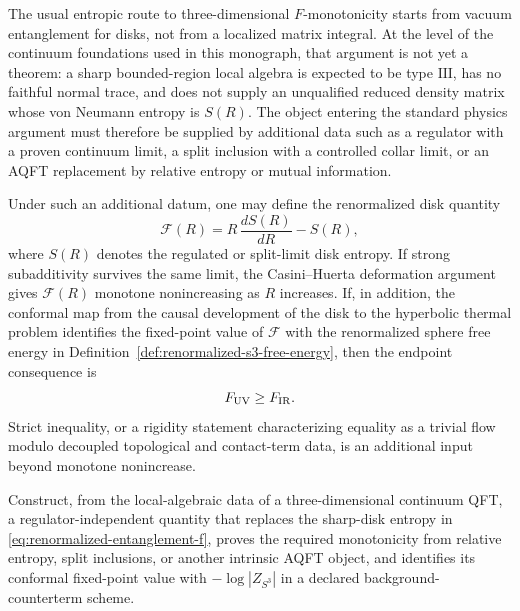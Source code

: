 \begin{remark}
\label{rem:conditional-entropic-f-monotonicity}
The usual entropic route to three-dimensional \(F\)-monotonicity starts from
vacuum entanglement for disks, not from a localized matrix integral.  At the
level of the continuum foundations used in this monograph, that argument is
not yet a theorem: a sharp bounded-region local algebra is expected to be
type \(\mathrm{III}\), has no faithful normal trace, and does not supply an
unqualified reduced density matrix whose von Neumann entropy is \(S(R)\).
The object entering the standard physics argument must therefore be supplied
by additional data such as a regulator with a proven continuum limit, a split
inclusion with a controlled collar limit, or an AQFT replacement by relative
entropy or mutual information.

Under such an additional datum, one may define the renormalized disk
quantity
\begin{equation}
  \mathcal F(R)=R\,\frac{dS(R)}{dR}-S(R),
  \label{eq:renormalized-entanglement-f}
\end{equation}
where \(S(R)\) denotes the regulated or split-limit disk entropy.  If strong
subadditivity survives the same limit, the Casini--Huerta deformation
argument gives \(\mathcal F(R)\) monotone nonincreasing as \(R\) increases.
If, in addition, the conformal map from the causal development of the disk to
the hyperbolic thermal problem identifies the fixed-point value of
\(\mathcal F\) with the renormalized sphere free energy in
Definition~\ref{def:renormalized-s3-free-energy}, then the endpoint
consequence is
\begin{equation}
  F_{\rm UV}\ge F_{\rm IR}.
  \label{eq:conditional-f-monotonicity}
\end{equation}
Strict inequality, or a rigidity statement characterizing equality as a
trivial flow modulo decoupled topological and contact-term data, is an
additional input beyond monotone nonincrease.
\end{remark}

\begin{openproblem}
\label{op:aqft-f-monotonicity}
Construct, from the local-algebraic data of a three-dimensional continuum
QFT, a regulator-independent quantity that replaces the sharp-disk entropy
in \eqref{eq:renormalized-entanglement-f}, proves the required monotonicity
from relative entropy, split inclusions, or another intrinsic AQFT object,
and identifies its conformal fixed-point value with
\(-\log|Z_{S^3}|\) in a declared background-counterterm scheme.
\end{openproblem}

